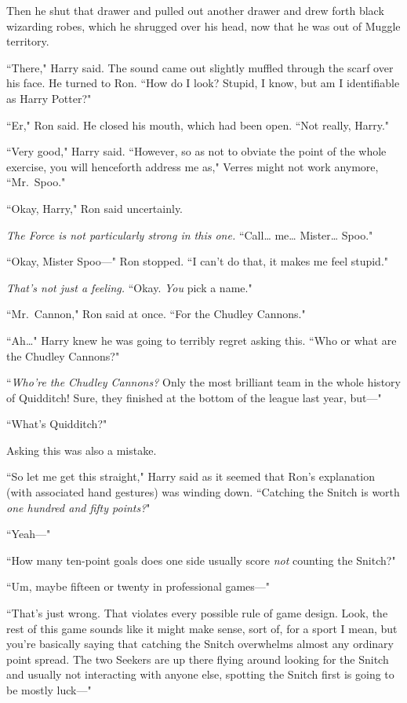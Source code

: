 Then he shut that drawer and pulled out another drawer and drew forth black wizarding robes, which he shrugged over his head, now that he was out of Muggle territory.

``There," Harry said. The sound came out slightly muffled through the scarf over his face. He turned to Ron. ``How do I look? Stupid, I know, but am I identifiable as Harry Potter?"

``Er," Ron said. He closed his mouth, which had been open. ``Not really, Harry."

``Very good," Harry said. ``However, so as not to obviate the point of the whole exercise, you will henceforth address me as," Verres might not work anymore, ``Mr.~Spoo."

``Okay, Harry," Ron said uncertainly.

\emph{The Force is not particularly strong in this one.} ``Call{\ldots} me{\ldots} Mister{\ldots} Spoo."

``Okay, Mister Spoo—" Ron stopped. ``I can't do that, it makes me feel stupid."

\emph{That's not just a feeling.} ``Okay. \emph{You} pick a name."

``Mr.~Cannon," Ron said at once. ``For the Chudley Cannons."

``Ah{\ldots}" Harry knew he was going to terribly regret asking this. ``Who or what are the Chudley Cannons?"

``\emph{Who're the Chudley Cannons?} Only the most brilliant team in the whole history of Quidditch! Sure, they finished at the bottom of the league last year, but—"

``What's Quidditch?"

Asking this was also a mistake.

``So let me get this straight," Harry said as it seemed that Ron's explanation (with associated hand gestures) was winding down. ``Catching the Snitch is worth \emph{one hundred and fifty points?}"

``Yeah—"

``How many ten-point goals does one side usually score \emph{not} counting the Snitch?"

``Um, maybe fifteen or twenty in professional games—"

``That's just wrong. That violates every possible rule of game design. Look, the rest of this game sounds like it might make sense, sort of, for a sport I mean, but you're basically saying that catching the Snitch overwhelms almost any ordinary point spread. The two Seekers are up there flying around looking for the Snitch and usually not interacting with anyone else, spotting the Snitch first is going to be mostly luck—"

